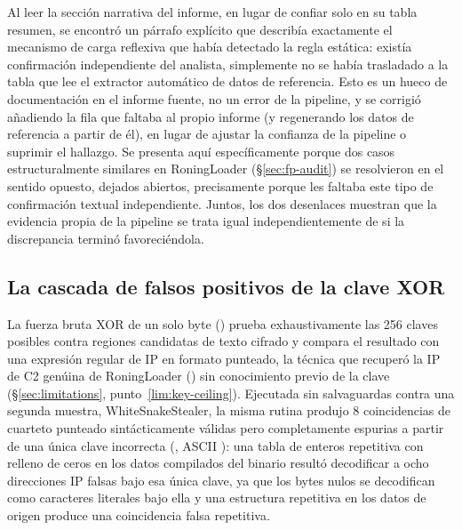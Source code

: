 Al leer la secci\'on narrativa del informe, en lugar de confiar solo en
su tabla resumen, se encontr\'o un p\'arrafo expl\'icito que
describ\'ia exactamente el mecanismo de carga reflexiva que hab\'ia
detectado la regla est\'atica: exist\'ia confirmaci\'on independiente
del analista, simplemente no se hab\'ia trasladado a la tabla que lee
el extractor autom\'atico de datos de referencia. Esto es un hueco de
documentaci\'on en el informe fuente, no un error de la pipeline, y se
corrigi\'o a\~nadiendo la fila que faltaba al propio informe (y
regenerando los datos de referencia a partir de \'el), en lugar de
ajustar la confianza de la pipeline o suprimir el hallazgo. Se
presenta aqu\'i espec\'ificamente porque dos casos estructuralmente
similares en RoningLoader (\S\ref{sec:fp-audit}) se resolvieron en el
sentido opuesto, dejados abiertos, precisamente porque les faltaba
este tipo de confirmaci\'on textual independiente. Juntos, los dos
desenlaces muestran que la evidencia propia de la pipeline se trata
igual independientemente de si la discrepancia termin\'o
favoreci\'endola.

\subsection{La cascada de falsos positivos de la clave XOR}
\label{sec:case-xor}

La fuerza bruta XOR de un solo byte () prueba
exhaustivamente las 256 claves posibles contra regiones candidatas de
texto cifrado y compara el resultado con una expresi\'on regular de IP
en formato punteado, la t\'ecnica que recuper\'o la IP de C2 gen\'uina
de RoningLoader () sin conocimiento previo de la
clave (\S\ref{sec:limitations}, punto~\ref{lim:key-ceiling}). Ejecutada sin salvaguardas
contra una segunda muestra, WhiteSnakeStealer, la misma rutina
produjo 8 coincidencias de cuarteto punteado sint\'acticamente
v\'alidas pero completamente espurias a partir de una \'unica clave
incorrecta (, ASCII ): una tabla de enteros
repetitiva con relleno de ceros en los datos compilados del binario
result\'o decodificar a ocho direcciones IP falsas bajo esa \'unica
clave, ya que los bytes nulos se decodifican como caracteres 
literales bajo ella y una estructura repetitiva en los datos de origen
produce una coincidencia falsa repetitiva.

